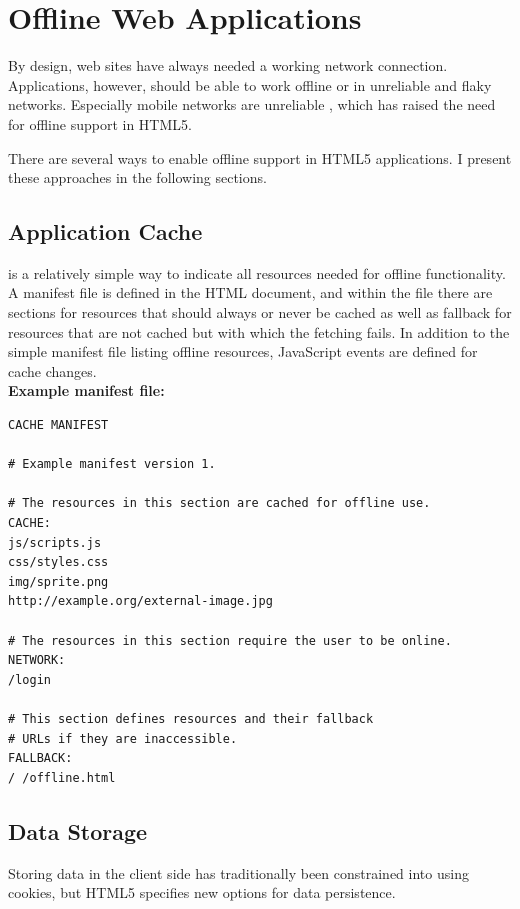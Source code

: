 \section{Offline Web Applications}

By design, web sites have always needed a working network
connection. Applications, however, should be able to work offline or
in unreliable and flaky networks. Especially mobile networks are
unreliable \cite{zandy2002reliable}, which has raised the need for
offline support in HTML5.

There are several ways to enable offline support in HTML5
applications. I present these approaches in the following sections.

\subsection{Application Cache}
\label{section:appcache}

 is a relatively simple way to indicate all resources
needed for offline functionality. A manifest file is defined in the
HTML document, and within the file there are sections for resources
that should always or never be cached as well as fallback 
for resources that are not cached but with which the fetching
fails. In addition to the simple manifest file listing offline
resources, JavaScript events are defined for cache
changes. \cite{HTML5draft} \\

\clearpage
\noindent \textbf{Example manifest file:}
\begin{verbatim}
CACHE MANIFEST

# Example manifest version 1.

# The resources in this section are cached for offline use.
CACHE:
js/scripts.js
css/styles.css
img/sprite.png
http://example.org/external-image.jpg

# The resources in this section require the user to be online.
NETWORK:
/login

# This section defines resources and their fallback
# URLs if they are inaccessible.
FALLBACK:
/ /offline.html
\end{verbatim}

\subsection{Data Storage}
\label{section:datastorage}

Storing data in the client side has traditionally been constrained
into using cookies, but HTML5 specifies new options for data
persistence.

